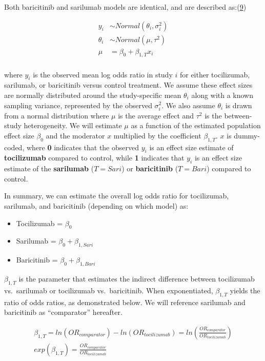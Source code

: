 \documentclass[
  12pt,
]{article}
\providecommand{\tightlist}{%
  \setlength{\itemsep}{0pt}\setlength{\parskip}{0pt}}
\begin{document}
Both baricitinib and sarilumab models are identical, and are described
as:(\protect\hyperlink{ref-pitchforth2012}{9})

\begin{align*}
y_i & \sim Normal(\theta_i, \sigma_i^2)\\
\theta_i & \sim Normal(\mu, \tau^2)\\
\mu &= \beta_0 + \beta_{1, T} x_i\\
\end{align*}

where \(y_i\) is the observed mean log odds ratio in study \(i\) for
either tocilizumab, sarilumab, or baricitinib versus control treatment.
We assume these effect sizes are normally distributed around the
study-specific mean \(\theta_i\) along with a known sampling variance,
represented by the observed \(\sigma_i^2\). We also assume \(\theta_i\)
is drawn from a normal distribution where \(\mu\) is the average effect
and \(\tau^2\) is the between-study heterogeneity. We will estimate
\(\mu\) as a function of the estimated population effect size
\(\beta_0\) and the moderator \(x\) multiplied by the coefficient
\(\beta_{1, T}\). \(x\) is dummy-coded, where \textbf{0} indicates that
the observed \(y_i\) is an effect size estimate of \textbf{tocilizumab}
compared to control, while \textbf{1} indicates that \(y_i\) is an
effect size estimate of the \textbf{sarilumab} (\(T = Sari\)) or
\textbf{baricitinib} (\(T = Bari\)) compared to control.

In summary, we can estimate the overall log odds ratio for tocilizumab,
sarilumab, and baricitinib (depending on which model) as:

\begin{itemize}
\tightlist
\item
  Tocilizumab = \(\beta_0\)
\item
  Sarilumab = \(\beta_0 + \beta_{1, Sari}\)
\item
  Baricitinib = \(\beta_0 + \beta_{1, Bari}\)
\end{itemize}

\(\beta_{1, T}\) is the parameter that estimates the indirect difference
between tocilizumab vs.~sarilumab or tocilizumab vs.~baricitinib. When
exponentiated, \(\beta_{1, T}\) yields the ratio of odds ratios, as
demonstrated below. We will reference sarilumab and baricitinib as
``comparator'' hereafter.

\begin{gather*}
\beta_{1, T}  = ln(OR_{comparator}) - ln(OR_{tocilizumab}) = ln(\frac{OR_{comparator}}{OR_{tocilizumab}})\\
exp(\beta_{1, T})  = \frac {OR_{comparator}}{OR_{tocilizumab}}
\end{gather*}
\end{document}
